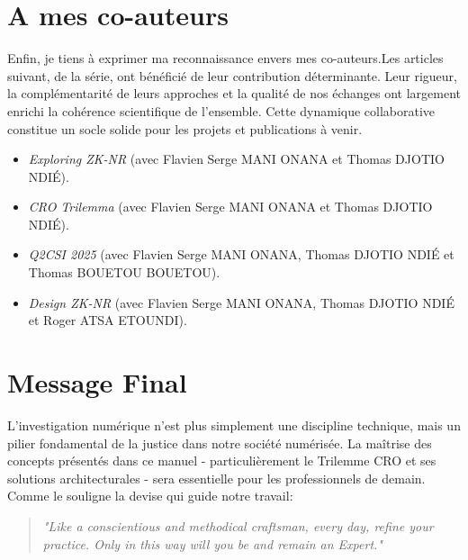 \documentclass[11pt,a4paper,oneside]{book}
\begin{document}
        \section*{A mes co-auteurs}
            Enfin, je tiens à exprimer ma reconnaissance envers mes co-auteurs.Les articles suivant, de la série, ont bénéficié de leur contribution déterminante. Leur rigueur, la complémentarité de leurs approches et la qualité de nos échanges ont largement enrichi la cohérence scientifique de l’ensemble. Cette dynamique collaborative constitue un socle solide pour les projets et publications à venir.
            \begin{itemize}
                \item \textit{Exploring ZK-NR} \cite{eprint:2025:1138} (avec Flavien Serge MANI ONANA et Thomas DJOTIO NDIÉ).
                \item \textit{CRO Trilemma} \cite{eprint:2025:1348} (avec Flavien Serge MANI ONANA et Thomas DJOTIO NDIÉ).
                \item \textit{Q2CSI 2025} \cite{eprint:2025:1380} (avec Flavien Serge MANI ONANA, Thomas DJOTIO NDIÉ et Thomas BOUETOU BOUETOU). 
                \item \textit{Design ZK-NR} \cite{eprint:2025:1422} (avec Flavien Serge MANI ONANA, Thomas DJOTIO NDIÉ et Roger ATSA ETOUNDI).
            \end{itemize}
            

        \section*{Message Final}
        L'investigation numérique n'est plus simplement une discipline technique, mais un pilier fondamental de la justice dans notre société numérisée. La maîtrise des concepts présentés dans ce manuel - particulièrement le Trilemme CRO et ses solutions architecturales - sera essentielle pour les professionnels de demain.
        Comme le souligne la devise qui guide notre travail:

        \begin{quote}
        \emph{"Like a conscientious and methodical craftsman, every day, refine your practice. Only in this way will you be and remain an Expert."}
        \vspace{1cm}
        \hfill \textit{}
        \end{quote}
\end{document}

